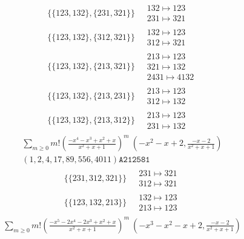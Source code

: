 \begin{scriptsize}
\begin{align}
\\
\{\{123, 132\}, \{231, 321\}\}
\ 
&
\begin{matrix}
132 \mapsto 123\\231 \mapsto 321
\end{matrix}
\\
\{\{123, 132\}, \{312, 321\}\}
\ 
&
\begin{matrix}
132 \mapsto 123\\312 \mapsto 321
\end{matrix}
\\
\{\{123, 132\}, \{213, 321\}\}
\ 
&
\begin{matrix}
213 \mapsto 123\\321 \mapsto 132\\2431 \mapsto 4132
\end{matrix}
\\
\{\{123, 132\}, \{213, 231\}\}
\ 
&
\begin{matrix}
213 \mapsto 123\\312 \mapsto 132
\end{matrix}
\\
\{\{123, 132\}, \{213, 312\}\}
\ 
&
\begin{matrix}
213 \mapsto 123\\231 \mapsto 132
\end{matrix}
\end{align}
$$
\begin{matrix}
\sum_{m \geq 0} m! \left(
\frac{-x^{4} - x^{3} + x^{2} + x}{x^{2} + x + 1}
\right)^m
\ 
\left(-x^{2} - x + 2, \frac{-x - 2}{x^{2} + x + 1}\right)
\\
\left(1, 2, 4, 17, 89, 556, 4011\right)
\texttt{A212581}
\end{matrix}
$$
\begin{align}
\{\{231, 312, 321\}\}
\ 
&
\begin{matrix}
231 \mapsto 321\\312 \mapsto 321
\end{matrix}
\\
\{\{123, 132, 213\}\}
\ 
&
\begin{matrix}
132 \mapsto 123\\213 \mapsto 123
\end{matrix}
\end{align}
$$
\begin{matrix}
\sum_{m \geq 0} m! \left(
\frac{-x^{5} - 2 x^{4} - 2 x^{3} + x^{2} + x}{x^{2} + x + 1}
\right)^m
\ 
\left(-x^{3} - x^{2} - x + 2, \frac{-x - 2}{x^{2} + x + 1}\right)
\\

\end{matrix}$$
\end{scriptsize}
